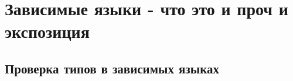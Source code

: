 \section{Зависимые языки - что это и проч и экспозиция}

\subsection{Проверка типов в зависимых языках}
